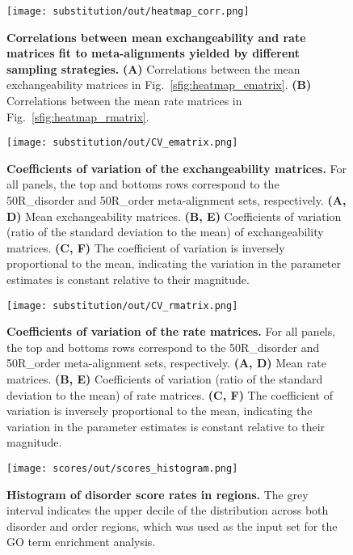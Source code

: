\begin{figure}[h!]
\texttt{[image: substitution/out/heatmap\_corr.png]}
\centering
\caption{\textbf{Correlations between mean exchangeability and rate matrices fit to meta-alignments yielded by different sampling strategies.}
\textbf{(A)} Correlations between the mean exchangeability matrices in Fig.~\ref{sfig:heatmap_ematrix}.
\textbf{(B)} Correlations between the mean rate matrices in Fig.~\ref{sfig:heatmap_rmatrix}.}
\label{sfig:heatmap_corr}
\end{figure}

\begin{figure}[h!]
\texttt{[image: substitution/out/CV\_ematrix.png]}
\centering
\caption{\textbf{Coefficients of variation of the exchangeability matrices.}
For all panels, the top and bottoms rows correspond to the 50R\_disorder and 50R\_order meta-alignment sets, respectively.
\textbf{(A, D)} Mean exchangeability matrices.
\textbf{(B, E)} Coefficients of variation (ratio of the standard deviation to the mean) of exchangeability matrices.
\textbf{(C, F)} The coefficient of variation is inversely proportional to the mean, indicating the variation in the parameter estimates is constant relative to their magnitude.}
\label{sfig:CV_ematrix}
\end{figure}

\begin{figure}[h!]
\texttt{[image: substitution/out/CV\_rmatrix.png]}
\centering
\caption{\textbf{Coefficients of variation of the rate matrices.}
For all panels, the top and bottoms rows correspond to the 50R\_disorder and 50R\_order meta-alignment sets, respectively.
\textbf{(A, D)} Mean rate matrices.
\textbf{(B, E)} Coefficients of variation (ratio of the standard deviation to the mean) of rate matrices.
\textbf{(C, F)} The coefficient of variation is inversely proportional to the mean, indicating the variation in the parameter estimates is constant relative to their magnitude.}
\label{sfig:CV_rmatrix}
\end{figure}

\begin{figure}[h!]
\texttt{[image: scores/out/scores\_histogram.png]}
\centering
\caption{\textbf{Histogram of disorder score rates in regions.}
The grey interval indicates the upper decile of the distribution across both disorder and order regions, which was used as the input set for the GO term enrichment analysis.}
\label{sfig:scores_histogram}
\end{figure}

